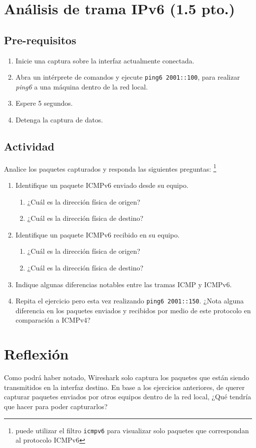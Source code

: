 \documentclass[11pt]{utalcaDoc}
\begin{document}
\section{Análisis de trama IPv6 (1.5 pto.)}
\subsection{Pre-requisitos}
\begin{enumerate}
    \item{ Inicie una captura sobre la interfaz actualmente conectada. }
    \item{ Abra un intérprete de comandos y ejecute \texttt{ping6 2001::100},
    para realizar \emph{ping6} a una máquina dentro de la red local. }
    \item{ Espere 5 segundos. }
    \item{ Detenga la captura de datos. }
\end{enumerate}
\subsection{Actividad}
Analice los paquetes capturados y responda las siguientes preguntas: 
\footnote{puede utilizar el filtro \texttt{icmpv6} para visualizar solo paquetes que 
correspondan al protocolo ICMPv6}
\begin{enumerate}
    \item{ Identifique un paquete ICMPv6 enviado desde su equipo. 
    \begin{enumerate}
        \item { ¿Cuál es la dirección física de origen?}
        \item { ¿Cuál es la dirección física de destino?}
    \end{enumerate}
    }
    \item{ Identifique un paquete ICMPv6 recibido en su equipo. 
    \begin{enumerate}
        \item { ¿Cuál es la dirección física de origen?}
        \item { ¿Cuál es la dirección física de destino?}
    \end{enumerate}
    }
    \item { Indique algunas diferencias notables entre las tramas ICMP y ICMPv6.}
    \item { Repita el ejercicio pero esta vez realizando \texttt{ping6 2001::150}. 
    ¿Nota alguna diferencia en los paquetes enviados y recibidos por medio de este
    protocolo en comparación a ICMPv4? }
    
\end{enumerate}

\section{Reflexión}
Como podrá haber notado, Wireshark solo captura los paquetes que están siendo 
transmitidos en la interfaz destino. En base a los ejercicios anteriores, de querer
capturar paquetes enviados por otros equipos dentro de la red local, ¿Qué tendría
que hacer para poder capturarlos?
\end{document}
